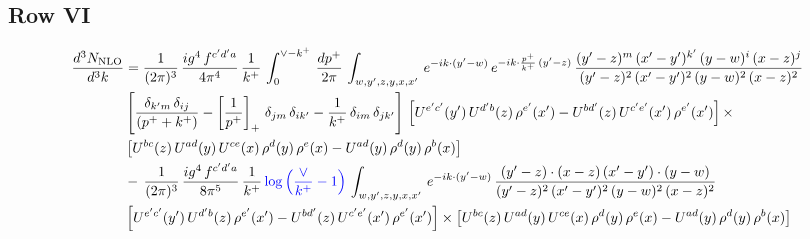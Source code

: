 \documentclass[9pt]{article}
\numberwithin{equation}{section}
\begin{document}
\subsection{Row VI}
\begin{align}
    \frac{d^{3}N_{\rm NLO}}{d^{3}k} & = \frac{1}{(2\pi)^{3}}\, \frac{ig^{4}\,f^{c'd'a}}{4\pi^{4}}\, \frac{1}{k^{+}}\,\int_{0}^{\vee-k^{+}}\, \frac{dp^{+}}{2\pi}\, \int_{w,y',z,y,x,x'}\, e^{-ik\cdot (y'-w)}\, e^{-ik\cdot \frac{p^{+}}{k^{+}}\,(y'-z)}\,\frac{(y'-z)^{m}\,(x'-y')^{k'}\,(y-w)^{i}\,(x-z)^{j}}{(y'-z)^{2}\,(x'-y')^{2}\,(y-w)^{2}\,(x-z)^{2}}\notag \\ & \left[\frac{\delta_{k'm}\,\delta_{ij}}{(p^{+}+k^{+})}-\left[\frac{1}{p^{+}}\right]_{+}\,\delta_{jm}\,\delta_{ik'}-\frac{1}{k^{+}}\, \delta_{im}\, \delta_{jk'}\right]\, \left[U^{e'c'}(y')\,U^{d'b}(z)\,\rho^{e'}(x')-U^{bd'}(z)\,U^{c'e'}(x')\,\rho^{e'}(x')\right]\times\notag \\ &  \left[U^{bc}(z)\,U^{ad}(y)\,U^{ce}(x)\,\rho^{d}(y)\,\rho^{e}(x)-U^{ad}(y)\,\rho^{d}(y)\,\rho^{b}(x)\right]\notag \\ &  -\,\frac{1}{(2\pi)^{3}}\, \frac{ig^{4}\,f^{c'd'a}}{8\pi^{5}}\, \frac{1}{k^{+}}\,{\color{blue}\log{\left(\frac{\vee}{k^{+}}-1\right)}}\, \int_{w,y',z,y,x,x'}\, e^{-ik\cdot (y'-w)}\,\frac{(y'-z)\cdot (x-z)\,(x'-y')\cdot (y-w)}{(y'-z)^{2}\,(x'-y')^{2}\,(y-w)^{2}\,(x-z)^{2}}\notag \\ & \left[U^{e'c'}(y')\,U^{d'b}(z)\,\rho^{e'}(x')-U^{bd'}(z)\,U^{c'e'}(x')\,\rho^{e'}(x')\right]\times  \left[U^{bc}(z)\,U^{ad}(y)\,U^{ce}(x)\,\rho^{d}(y)\,\rho^{e}(x)-U^{ad}(y)\,\rho^{d}(y)\,\rho^{b}(x)\right]
\end{align}
\end{document}
